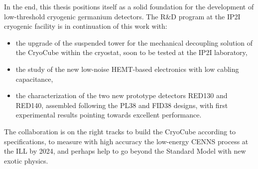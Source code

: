 In the end, this thesis positions itself as a solid foundation for the development of low-threshold cryogenic germanium detectors. The R\&D program at the IP2I cryogenic facility is in continuation of this work with:
\begin{itemize}
\item the upgrade of the suspended tower for the mechanical decoupling solution of the CryoCube within the \Ricochet{} cryostat, soon to be tested at the IP2I laboratory,
\item the study of the new low-noise HEMT-based electronics with low cabling capacitance, 
\item the characterization of the two new prototype detectors RED130 and RED140, assembled following the PL38 and FID38 designs, with first experimental results pointing towards excellent performance.
\end{itemize}
The \Ricochet{} collaboration is on the right tracks to build the CryoCube according to specifications, to measure with high accuracy the low-energy CENNS process at the ILL by 2024, and perhaps help to go beyond the Standard Model with new exotic physics.